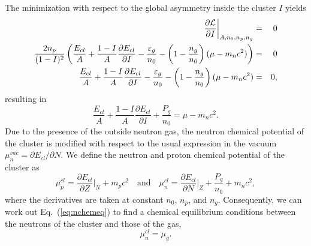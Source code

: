 The minimization with respect to the global asymmetry inside the cluster $I$ 
yields
%
\begin{eqnarray}
  \frac{\partial \mathcal{L}}{\partial I}\bigg|_{A,n_0,n_p,n_g} &=& 0 \notag \\
  \frac{2n_p}{(1-I)^2}\left(\frac{E_{cl}}{A} + \frac{1-I}{A}
    \frac{\partial E_{cl}}{\partial I} - \frac{\varepsilon_g}{n_0} -
\left(1-\frac{n_g}{n_0}\right)(\mu-m_nc^2)\right) &=& 0 \notag \\
\frac{E_{cl}}{A} + \frac{1-I}{A}
\frac{\partial E_{cl}}{\partial I} - \frac{\varepsilon_g}{n_0} -
\left(1-\frac{n_g}{n_0}\right)(\mu-m_nc^2) &=& 0,\label{eq:nchemeq1}
\end{eqnarray}
%
resulting in
%
\begin{equation}
\frac{E_{cl}}{A} + \frac{1-I}{A}
\frac{\partial E_{cl}}{\partial I} + \frac{P_g}{n_0} = \mu -
m_n c^2.\label{eq:nchemeq}
\end{equation}
%
Due to the presence of the outside neutron gas, the neutron chemical potential 
of the cluster is modified with respect to the usual expression in the vacuum
$\mu_n^{vac} = \partial E_{cl}/ \partial N$. We define the neutron and proton 
chemical potential of the cluster as
%
\begin{equation}
  \mu_p^{cl} = \frac{\partial E_{cl}}{\partial Z}\bigg|_{N} + m_pc^2 \quad \text{and}
  \quad \mu_n^{cl} = \frac{\partial E_{cl}}{\partial N}\bigg|_{Z} +
  \frac{P_g}{n_0} + m_nc^2,
\end{equation}
%
where the derivatives are taken at constant $n_0$, $n_p$, and $n_g$.
Consequently, we can work out Eq.~(\ref{eq:nchemeq}) to find a chemical
equilibrium conditions between the neutrons of the cluster and those of the
gas,
%
\begin{equation}
  \mu_n^{cl} = \mu_g.\label{eq:muneq}
\end{equation}
%

